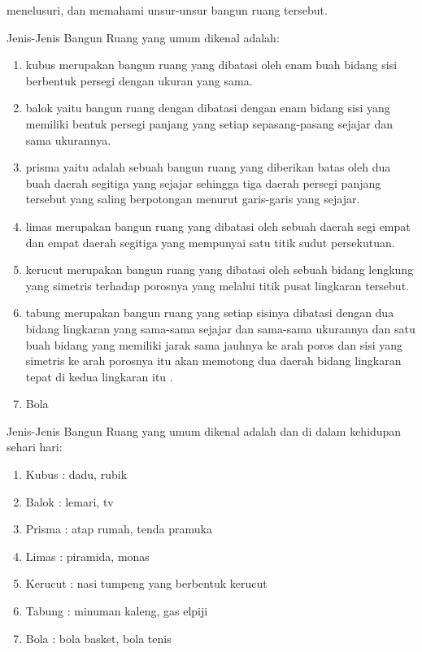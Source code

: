menelusuri, dan memahami unsur-unsur bangun ruang tersebut.

Jenis-Jenis Bangun Ruang yang umum dikenal adalah:
\begin{enumerate}
\item kubus merupakan bangun ruang yang dibatasi oleh enam buah bidang sisi berbentuk persegi dengan ukuran yang sama.
\item balok yaitu bangun ruang dengan dibatasi dengan enam bidang sisi yang memiliki bentuk persegi panjang yang setiap sepasang-pasang sejajar dan sama ukurannya.
\item prisma yaitu adalah sebuah bangun ruang yang diberikan batas oleh dua buah daerah segitiga yang sejajar sehingga tiga daerah persegi panjang tersebut yang saling berpotongan menurut garis-garis yang sejajar.
\item limas merupakan bangun ruang yang dibatasi oleh sebuah daerah segi empat dan empat daerah segitiga yang mempunyai satu titik sudut persekutuan.
\item kerucut merupakan bangun ruang yang dibatasi oleh sebuah bidang lengkung yang simetris terhadap porosnya yang melalui titik pusat lingkaran tersebut.
\item tabung merupakan bangun ruang yang setiap sisinya dibatasi dengan dua bidang lingkaran yang sama-sama sejajar dan sama-sama ukurannya dan satu buah bidang 
     yang memiliki jarak sama jauhnya ke arah poros dan sisi yang simetris ke arah porosnya itu akan memotong dua daerah bidang lingkaran tepat di kedua lingkaran itu .
\item Bola
\end{enumerate}

Jenis-Jenis Bangun Ruang yang umum dikenal adalah dan di dalam kehidupan sehari hari:
\begin{enumerate}
\item Kubus    : dadu, rubik
\item Balok    : lemari, tv
\item Prisma   : atap rumah, tenda pramuka
\item Limas    : piramida, monas
\item Kerucut  : nasi tumpeng yang berbentuk kerucut
\item Tabung   : minuman kaleng, gas elpiji
\item Bola     : bola basket, bola tenis
\end{enumerate}

